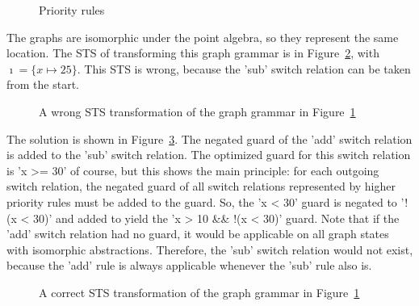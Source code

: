\begin{figure}[ht]
  \begin{center}
    \hspace{20px}
    \hspace{20px}
  \end{center}
  \caption{Priority rules}
  \label{fig:priority_gg}
\end{figure} 

The graphs are isomorphic under the point algebra, so they represent the same location. The STS of transforming this graph grammar is in Figure~\ref{fig:priority_sts_wrong}, with $\imath = \{x \mapsto 25\}$. This STS is wrong, because the 'sub' switch relation can be taken from the start.

\begin{figure}[ht]
  \begin{center}
    
  \end{center}
  \caption{A wrong STS transformation of the graph grammar in Figure~\ref{fig:priority_gg}}
  \label{fig:priority_sts_wrong}
\end{figure}

The solution is shown in Figure~\ref{fig:priority_sts_right}. The negated guard of the 'add' switch relation is added to the 'sub' switch relation. The optimized guard for this switch relation is 'x >= 30' of course, but this shows the main principle: for each outgoing switch relation, the negated guard of all switch relations represented by higher priority rules must be added to the guard. So, the 'x < 30' guard is negated to '!(x < 30)' and added to yield the 'x > 10 \&\& !(x < 30)' guard. Note that if the 'add' switch relation had no guard, it would be applicable on all graph states with isomorphic abstractions. Therefore, the 'sub' switch relation would not exist, because the 'add' rule is always applicable whenever the 'sub' rule also is.

\begin{figure}[ht]
  \begin{center}
    
  \end{center}
  \caption{A correct STS transformation of the graph grammar in Figure~\ref{fig:priority_gg}}
  \label{fig:priority_sts_right}
\end{figure}
